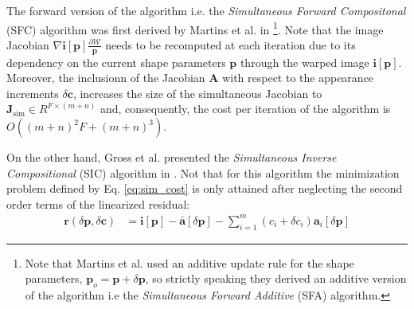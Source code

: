 The forward version of the algorithm i.e. the \emph{Simultaneous Forward Compositonal} (SFC) algorithm was first derived by Martins et al. in \cite{Martins2010}\footnote{Note that Martins et al.  used an additive update rule for the shape parameters, $\mathbf{p}_o =  \mathbf{p} + \delta\mathbf{p}$, so strictly speaking they derived an additive version of the algorithm i.e the \emph{Simultaneous Forward Additive} (SFA) algorithm.}. Note that the image Jacobian $\nabla\mathbf{i}[\mathbf{p}]\frac{\partial\mathcal{W}}{\mathbf{p}}$ needs to be recomputed at each iteration due to its dependency on the current shape parameters $\mathbf{p}$ through the warped image $\mathbf{i}[\mathbf{p}]$. Moreover, the inclusionn of the Jacobian $\mathbf{A}$ with respect to the appearance increments $\delta\mathbf{c}$, increases the size of the simultaneous Jacobian to $\mathbf{J}_\text{sim} \in R^{F\times(m+n)}$ and, consequently, the cost per iteration of the algorithm is $O((m+n)^2F + (m + n)^3)$.

On the other hand, Gross et al. presented the \emph{Simultaneous Inverse Compositional} (SIC) algorithm in \cite{Gross2005}. Not that for this algorithm the minimization problem defined by Eq. \ref{eq:sim_cost} is only attained after neglecting the second order terms of the linearized residual:
\begin{equation}
    \begin{aligned}
        \mathbf{r}(\delta\mathbf{p}, \delta\mathbf{c}) & = \mathbf{i}[\mathbf{p}] - \bar{\mathbf{a}}[\delta\mathbf{p}] - \sum_{i=1}^m (c_i + \delta c_i) \mathbf{a}_i[\delta\mathbf{p}] 
    \label{eq:sic_res}
    \end{aligned}
\end{equation}

